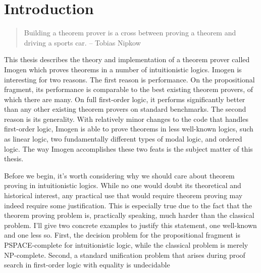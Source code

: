 
\chapter*{Introduction}\label{chapter.intro}

\begin{quote} Building a theorem prover is a cross between proving a
theorem and driving a sports car.  -- Tobias Nipkow\end{quote}

This thesis describes the theory and implementation of a theorem
prover called Imogen which proves theorems in a number of
intuitionistic logics.  Imogen is interesting for two reasons.  The
first reason is performance.  On the propositional fragment, its
performance is comparable to the best existing theorem provers, of
which there are many.  On full first-order logic, it performs
significantly better than any other existing theorem provers on
standard benchmarks.  The second reason is its generality.  With
relatively minor changes to the code that handles first-order logic,
Imogen is able to prove theorems in less well-known logics, such as
linear logic, two fundamentally different types of modal logic, and
ordered logic.  The way Imogen accomplishes these two feats is the
subject matter of this thesis.

Before we begin, it's worth considering why we should care about
theorem proving in intuitionistic logics.  While no one would doubt
its theoretical and historical interest, any practical use that would
require theorem proving may indeed require some justification.
This is especially true due to the fact that the theorem proving
problem is, practically speaking, much harder than the classical
problem.  I'll give two concrete examples to justify this statement,
one well-known and one less so.  First, the decision problem
for the propositional fragment is PSPACE-complete for intuitionistic
logic, while the classical problem is merely NP-complete.  Second,
a standard unification problem that arises during proof search
in first-order logic with equality is undecidable




